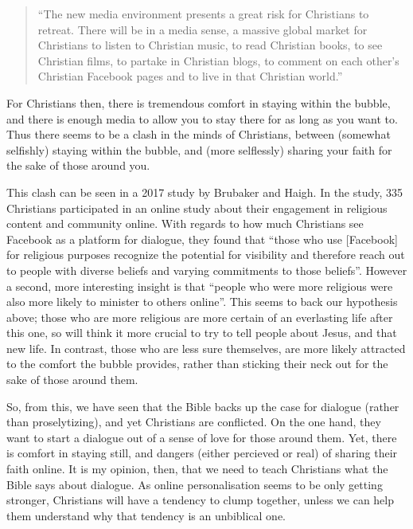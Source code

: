 \documentclass[]{article}
\begin{document}
\begin{quote}
``The new media environment presents a great risk for Christians to
retreat. There will be in a media sense, a massive global market for
Christians to listen to Christian music, to read Christian books, to see
Christian films, to partake in Christian blogs, to comment on each
other's Christian Facebook pages and to live in that Christian
world.''\autocite{TaylorMarkScottChristians2014}
\end{quote}

For Christians then, there is tremendous comfort in staying within the
bubble, and there is enough media to allow you to stay there for as long
as you want to. Thus there seems to be a clash in the minds of
Christians, between (somewhat selfishly) staying within the bubble, and
(more selflessly) sharing your faith for the sake of those around you.

This clash can be seen in a 2017 study by Brubaker and
Haigh\autocite{BrubakerReligiousFacebookExperience2017}. In the study,
335 Christians participated in an online study about their engagement in
religious content and community online. With regards to how much
Christians see Facebook as a platform for dialogue, they found that
``those who use {[}Facebook{]} for religious purposes recognize the
potential for visibility and therefore reach out to people with diverse
beliefs and varying commitments to those
beliefs''\autocite[pg 8]{BrubakerReligiousFacebookExperience2017}.
However a second, more interesting insight is that ``people who were
more religious were also more likely to minister to others
online''\autocite[pg 9]{BrubakerReligiousFacebookExperience2017}. This
seems to back our hypothesis above; those who are more religious are
more certain of an everlasting life after this one, so will think it
more crucial to try to tell people about Jesus, and that new life. In
contrast, those who are less sure themselves, are more likely attracted
to the comfort the bubble provides, rather than sticking their neck out
for the sake of those around them.

So, from this, we have seen that the Bible backs up the case for
dialogue (rather than proselytizing), and yet Christians are conflicted.
On the one hand, they want to start a dialogue out of a sense of love
for those around them. Yet, there is comfort in staying still, and
dangers (either percieved or real) of sharing their faith online. It is
my opinion, then, that we need to teach Christians what the Bible says
about dialogue. As online personalisation seems to be only getting
stronger, Christians will have a tendency to clump together, unless we
can help them understand why that tendency is an unbiblical one.
\end{document}
